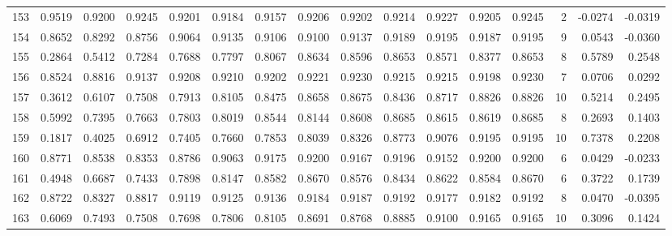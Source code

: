 \begin{tabular}{lrrrrrrrrrrrrrrr}
153 &      0.9519 &  0.9200 &  0.9245 &  0.9201 &  0.9184 &  0.9157 &  0.9206 &  0.9202 &  0.9214 &  0.9227 &   0.9205 &     0.9245 &      2 &                   -0.0274 &                    -0.0319 \\
154 &      0.8652 &  0.8292 &  0.8756 &  0.9064 &  0.9135 &  0.9106 &  0.9100 &  0.9137 &  0.9189 &  0.9195 &   0.9187 &     0.9195 &      9 &                    0.0543 &                    -0.0360 \\
155 &      0.2864 &  0.5412 &  0.7284 &  0.7688 &  0.7797 &  0.8067 &  0.8634 &  0.8596 &  0.8653 &  0.8571 &   0.8377 &     0.8653 &      8 &                    0.5789 &                     0.2548 \\
156 &      0.8524 &  0.8816 &  0.9137 &  0.9208 &  0.9210 &  0.9202 &  0.9221 &  0.9230 &  0.9215 &  0.9215 &   0.9198 &     0.9230 &      7 &                    0.0706 &                     0.0292 \\
157 &      0.3612 &  0.6107 &  0.7508 &  0.7913 &  0.8105 &  0.8475 &  0.8658 &  0.8675 &  0.8436 &  0.8717 &   0.8826 &     0.8826 &     10 &                    0.5214 &                     0.2495 \\
158 &      0.5992 &  0.7395 &  0.7663 &  0.7803 &  0.8019 &  0.8544 &  0.8144 &  0.8608 &  0.8685 &  0.8615 &   0.8619 &     0.8685 &      8 &                    0.2693 &                     0.1403 \\
159 &      0.1817 &  0.4025 &  0.6912 &  0.7405 &  0.7660 &  0.7853 &  0.8039 &  0.8326 &  0.8773 &  0.9076 &   0.9195 &     0.9195 &     10 &                    0.7378 &                     0.2208 \\
160 &      0.8771 &  0.8538 &  0.8353 &  0.8786 &  0.9063 &  0.9175 &  0.9200 &  0.9167 &  0.9196 &  0.9152 &   0.9200 &     0.9200 &      6 &                    0.0429 &                    -0.0233 \\
161 &      0.4948 &  0.6687 &  0.7433 &  0.7898 &  0.8147 &  0.8582 &  0.8670 &  0.8576 &  0.8434 &  0.8622 &   0.8584 &     0.8670 &      6 &                    0.3722 &                     0.1739 \\
162 &      0.8722 &  0.8327 &  0.8817 &  0.9119 &  0.9125 &  0.9136 &  0.9184 &  0.9187 &  0.9192 &  0.9177 &   0.9182 &     0.9192 &      8 &                    0.0470 &                    -0.0395 \\
163 &      0.6069 &  0.7493 &  0.7508 &  0.7698 &  0.7806 &  0.8105 &  0.8691 &  0.8768 &  0.8885 &  0.9100 &   0.9165 &     0.9165 &     10 &                    0.3096 &                     0.1424 \\

\end{tabular}
